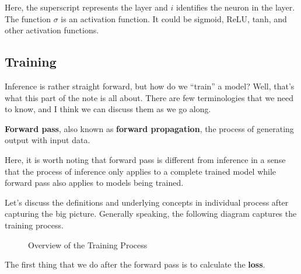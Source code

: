 \documentclass[../../main.tex]{subfiles}
\begin{document}
Here, the superscript represents the layer and $i$ identifies the
neuron in the layer. The function $\sigma$ is an activation function.
It could be sigmoid, ReLU, tanh, and other activation functions.

\subsection{Training}

Inference is rather straight forward, but how do we ``train''
a model? Well, that's what this part of the note is all about.
There are few terminologies that we need to know, and I think
we can discuss them as we go along.

\begin{definition}{}{}
\textbf{Forward pass}, also known as \textbf{forward propagation},
the process of generating output with input data.
\end{definition}

Here, it is worth noting that forward pass is different from
inference in a sense that the process of inference only applies
to a complete trained model while forward pass also applies to
models being trained.

Let's discuss the definitions and underlying concepts in individual
process after capturing the big picture. Generally speaking,
the following diagram captures the training process.

\begin{figure}[H]
\centering
{}
\caption{Overview of the Training Process}
\end{figure}

The first thing that we do after the forward pass is to calculate
the \textbf{loss}.
\end{document}
